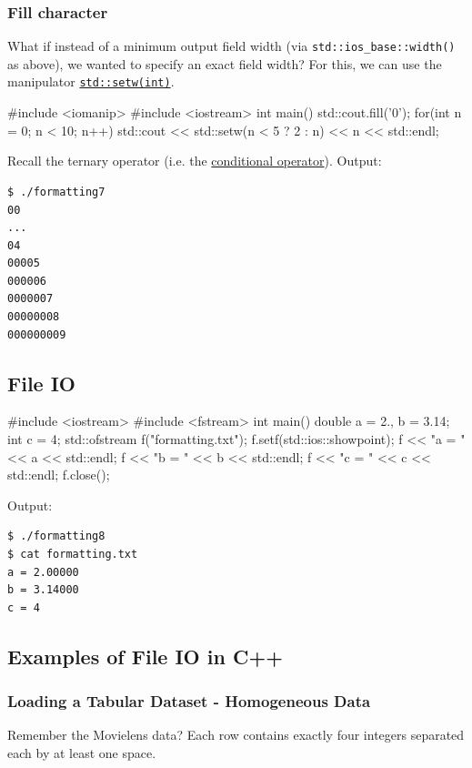 \documentclass[12pt,letterpaper,twoside]{article}
\begin{document}
\subsubsection{Fill character}
What if instead of a minimum output field width (via \texttt{std::ios\_base::width()} 
as above), we wanted to specify an exact field width? For this, we can use 
the manipulator \href{https://en.cppreference.com/w/cpp/io/manip/setw}
{\texttt{std::setw(int)}}.
\begin{cpp}
#include <iomanip>
#include <iostream>
 int main() {
  std::cout.fill('0');
  for(int n = 0; n < 10; n++)
    std::cout << std::setw(n < 5 ? 2 : n) << n << std::endl;
}
\end{cpp}

Recall the ternary operator (i.e. the 
\href{https://en.cppreference.com/w/cpp/language/operator_other}{conditional operator}). 
Output:

\begin{verbatim}
$ ./formatting7
00
...
04
00005
000006
0000007
00000008
000000009
\end{verbatim}

\subsection{File IO}

\begin{cpp}
#include <iostream>
#include <fstream>
int main() {
  double a = 2., b = 3.14;
  int c = 4;
  std::ofstream f("formatting.txt");
  f.setf(std::ios::showpoint);
  f << "a = " << a << std::endl;
  f << "b = " << b << std::endl;
  f << "c = " << c << std::endl;
  f.close();
}
\end{cpp}

Output:

\begin{verbatim}
$ ./formatting8
$ cat formatting.txt
a = 2.00000
b = 3.14000
c = 4
\end{verbatim}

\subsection{Examples of File IO in C++}
\subsubsection{Loading a Tabular Dataset - Homogeneous Data}
Remember the Movielens data? Each row contains exactly four integers separated each by 
at least one space. 
\end{document}
